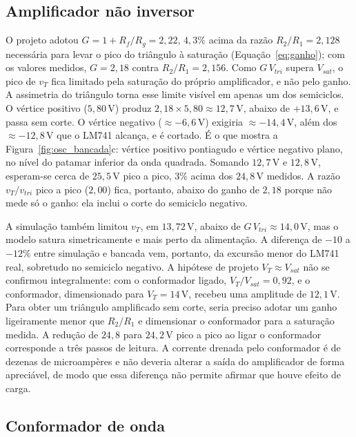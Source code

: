 \documentclass[11pt,a4paper]{article}
\begin{document}
\subsection{Amplificador não inversor}
\label{sec:disc_amplificador}

O projeto adotou $G = 1 + R_f/R_g = 2{,}22$, $4{,}3\%$ acima da razão $R_2/R_1 = 2{,}128$ necessária para levar o pico do triângulo à saturação (Equação~\ref{eq:ganho}); com os valores medidos, $G = 2{,}18$ contra $R_2/R_1 = 2{,}156$. Como $G\,V_{tri}$ supera $V_{sat}$, o pico de $v_T$ fica limitado pela saturação do próprio amplificador, e não pelo ganho. A assimetria do triângulo torna esse limite visível em apenas um dos semiciclos. O vértice positivo ($5{,}80\,\text{V}$) produz $2{,}18 \times 5{,}80 \approx 12{,}7\,\text{V}$, abaixo de $+13{,}6\,\text{V}$, e passa sem corte. O vértice negativo ($\approx -6{,}6\,\text{V}$) exigiria $\approx -14{,}4\,\text{V}$, além dos $\approx -12{,}8\,\text{V}$ que o LM741 alcança, e é cortado. É o que mostra a Figura~\ref{fig:osc_bancada}c: vértice positivo pontiagudo e vértice negativo plano, no nível do patamar inferior da onda quadrada. Somando $12{,}7\,\text{V}$ e $12{,}8\,\text{V}$, esperam-se cerca de $25{,}5\,\text{V}$ pico a pico, $3\%$ acima dos $24{,}8\,\text{V}$ medidos. A razão $v_T/v_{tri}$ pico a pico ($2{,}00$) fica, portanto, abaixo do ganho de $2{,}18$ porque não mede só o ganho: ela inclui o corte do semiciclo negativo.

A simulação também limitou $v_T$, em $13{,}72\,\text{V}$, abaixo de $G\,V_{tri} \approx 14{,}0\,\text{V}$, mas o modelo satura simetricamente e mais perto da alimentação. A diferença de $-10$ a $-12\%$ entre simulação e bancada vem, portanto, da excursão menor do LM741 real, sobretudo no semiciclo negativo. A hipótese de projeto $V_T \approx V_{sat}$ não se confirmou integralmente: com o conformador ligado, $V_T/V_{sat} = 0{,}92$, e o conformador, dimensionado para $V_T = 14\,\text{V}$, recebeu uma amplitude de $12{,}1\,\text{V}$. Para obter um triângulo amplificado sem corte, seria preciso adotar um ganho ligeiramente menor que $R_2/R_1$ e dimensionar o conformador para a saturação medida. A redução de $24{,}8$ para $24{,}2\,\text{V}$ pico a pico ao ligar o conformador corresponde a três passos de leitura. A corrente drenada pelo conformador é de dezenas de microampères e não deveria alterar a saída do amplificador de forma apreciável, de modo que essa diferença não permite afirmar que houve efeito de carga.

\subsection{Conformador de onda}
\end{document}

